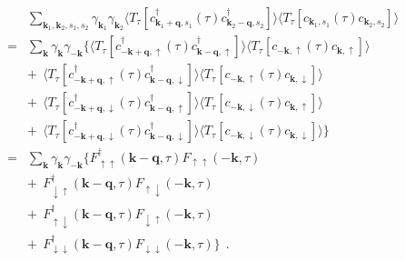 \documentclass[a4j]{jsarticle}
\begin{document}
\begin{eqnarray}
	&&
	\sum_{\bm{k}_{1} , \bm{k}_{2} , s_{1} ,s_{2} }
	\gamma_{\bm{k}_{1}}
	\gamma_{\bm{k}_{2}}
	\langle T_{\tau} [
			c_{ \bm{k}_{1}+\bm{q} , s_{1} }^{\dagger} (\tau)
			c_{ \bm{k}_{2}-\bm{q} , s_{2} }^{\dagger}
		] \rangle
	\langle T_{\tau} [
			c_{ \bm{k}_{1} , s_{1} } (\tau)
			c_{ \bm{k}_{2} , s_{2} }
		] \rangle
	\\ &=&
	\sum_{ \bm{k} }
	\gamma_{\bm{k}}
	\gamma_{-\bm{k}}
	\Big\{
	\langle T_{\tau} [
			c_{ - \bm{k} + \bm{q} , \uparrow }^{\dagger} (\tau)
			c_{ \bm{k} - \bm{q} , \uparrow }^{\dagger}
		] \rangle
	\langle T_{\tau} [
			c_{ - \bm{k} , \uparrow } (\tau)
			c_{ \bm{k} , \uparrow }
		] \rangle
	\nonumber \\ && + \ \
	\langle T_{\tau} [
			c_{ - \bm{k} + \bm{q} , \uparrow }^{\dagger} (\tau)
			c_{ \bm{k} - \bm{q} , \downarrow }^{\dagger}
		] \rangle
	\langle T_{\tau} [
			c_{ - \bm{k} , \uparrow } (\tau)
			c_{ \bm{k} , \downarrow }
		] \rangle
	\nonumber \\[2mm] && + \ \
	\langle T_{\tau} [
			c_{ - \bm{k} + \bm{q} , \downarrow }^{\dagger} (\tau)
			c_{ \bm{k} - \bm{q} , \uparrow }^{\dagger}
		] \rangle
	\langle T_{\tau} [
			c_{ - \bm{k} , \downarrow } (\tau)
			c_{ \bm{k} , \uparrow }
		] \rangle
	\nonumber \\[2mm] && + \ \
	\langle T_{\tau} [
			c_{ - \bm{k} + \bm{q} , \downarrow }^{\dagger} (\tau)
			c_{ \bm{k} - \bm{q} , \downarrow }^{\dagger}
		] \rangle
	\langle T_{\tau} [
			c_{ - \bm{k} , \downarrow } (\tau)
			c_{ \bm{k} , \downarrow }
		] \rangle
	\Big\}
	\nonumber \\[2mm]
	&=&
	\sum_{ \bm{k} }
	\gamma_{\bm{k}}
	\gamma_{-\bm{k}}
	\Big\{
	F_{ \uparrow \uparrow }^{\dagger}( \bm{k} - \bm{q} , \tau )
	F_{ \uparrow \uparrow } ( - \bm{k} , \tau )
	\nonumber \\ && + \ \
	F_{ \downarrow \uparrow }^{\dagger}( \bm{k} - \bm{q} , \tau )
	F_{ \uparrow \downarrow } ( - \bm{k} , \tau )
	\nonumber \\[2mm] && + \ \
	F_{ \uparrow \downarrow }^{\dagger}( \bm{k} - \bm{q} , \tau )
	F_{ \downarrow \uparrow } ( - \bm{k} , \tau )
	\nonumber \\[2mm] && + \ \
	F_{ \downarrow \downarrow }^{\dagger}( \bm{k} - \bm{q} , \tau )
	F_{ \downarrow \downarrow } ( - \bm{k} , \tau )
	\Big\}
	\ \ .
\end{eqnarray}
%
%
%
%
\end{document}
